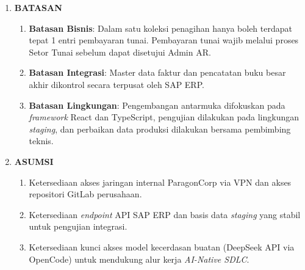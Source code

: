 \begin{framed}
\begin{enumerate}[label=\arabic*.,leftmargin=0.8cm,itemsep=8pt,topsep=4pt,parsep=0pt,partopsep=0pt]
\item \textbf{BATASAN}
  \begin{enumerate}[label=\alph*),topsep=2pt,itemsep=2pt,parsep=0pt,partopsep=0pt,leftmargin=0.5cm]
    \item \textbf{Batasan Bisnis}: Dalam satu koleksi penagihan hanya boleh terdapat tepat 1 entri pembayaran tunai. Pembayaran tunai wajib melalui proses Setor Tunai sebelum dapat disetujui Admin AR.
    \item \textbf{Batasan Integrasi}: Master data faktur dan pencatatan buku besar akhir dikontrol secara terpusat oleh SAP ERP.
    \item \textbf{Batasan Lingkungan}: Pengembangan antarmuka difokuskan pada \textit{framework} React dan TypeScript, pengujian dilakukan pada lingkungan \textit{staging}, dan perbaikan data produksi dilakukan bersama pembimbing teknis.
  \end{enumerate}

\item \textbf{ASUMSI}
  \begin{enumerate}[label=\alph*),topsep=2pt,itemsep=2pt,parsep=0pt,partopsep=0pt,leftmargin=0.5cm]
    \item Ketersediaan akses jaringan internal ParagonCorp via VPN dan akses repositori GitLab perusahaan.
    \item Ketersediaan \textit{endpoint} API SAP ERP dan basis data \textit{staging} yang stabil untuk pengujian integrasi.
    \item Ketersediaan kunci akses model kecerdasan buatan (DeepSeek API via OpenCode) untuk mendukung alur kerja \textit{AI-Native SDLC}.
  \end{enumerate}


\end{enumerate}
\end{framed}
